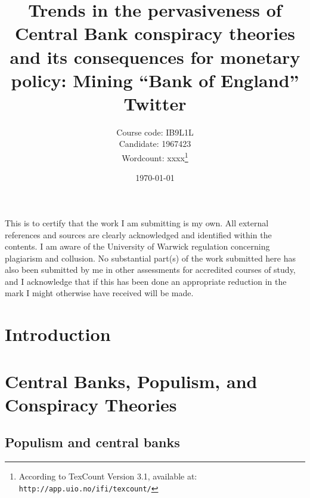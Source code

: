 \documentclass[11pt]{article}
\title{Trends in the pervasiveness of Central Bank conspiracy theories and its consequences for monetary policy: Mining ``Bank of England'' Twitter}
\author{Course code: IB9L1L\\
	    Candidate: 1967423\\
	    Wordcount: xxxx\footnote{According to TexCount Version 3.1, available at: \texttt{http://app.uio.no/ifi/texcount/}}}
\date{\today}
\begin{document}
\begin{titlepage}
	\centering
	\maketitle
{} 

\vspace{1in}

This is to certify that the work I am submitting is my own. All external references and sources are clearly acknowledged and identified within the contents. I am aware of the University of Warwick regulation concerning plagiarism and collusion.
No substantial part(s) of the work submitted here has also been submitted by me in other assessments for accredited courses of study, and I acknowledge that if this has been done an appropriate reduction in the mark I might otherwise have received will be made.
	
	\end{titlepage}
	
\section{Introduction} \label{Section: Introduction}

\section{Central Banks, Populism, and Conspiracy Theories} \label{Section: Central Banks, Populism, and Conspiracy Theories}

\subsection{Populism and central banks} \label{subsection: Populism and central banks}
\end{document}
